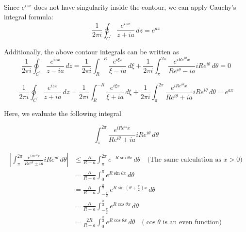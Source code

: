 \documentclass[letterpaper, 12pt]{article}
\theoremstyle{custom}
\begin{document}
Since $e^{izx}$ does not have singularity inside the contour, we can apply Cauchy's integral formula:
\begin{equation*}
  \frac{1}{2 \pi i} \oint_{C^\prime} \frac{e^{i z x}}{z+ia} \, dz = e^{a x}
\end{equation*}

Additionally, the above contour integrals can be written as
\begin{equation*}
  \frac{1}{2 \pi i} \oint_{C^\prime} \frac{e^{i z x}}{z-ia} \, dz 
  = \frac{1}{2 \pi i} \int_{R}^{-R} \frac{e^{i\xi x}}{\xi-ia} \, d\xi  + \frac{1}{2 \pi i} \int_{\pi}^{2 \pi} \frac{e^{i Re^{i \theta} x}}{Re^{i \theta}-ia} iRe^{i \theta} \, d \theta
  =0
\end{equation*}

\begin{equation*}
  \frac{1}{2 \pi i} \oint_{C^\prime} \frac{e^{i z x}}{z+ia} \, dz 
  = \frac{1}{2 \pi i} \int_{R}^{-R} \frac{e^{i\xi x}}{\xi+ia} \, d\xi  + \frac{1}{2 \pi i} \int_{\pi}^{2\pi} \frac{e^{i Re^{i \theta} x}}{Re^{i \theta}+ia} iRe^{i \theta} \, d \theta
  = e^{a x}
\end{equation*}

Here, we evaluate the following integral

\begin{equation*}
  \int_{\pi}^{2\pi} \frac{e^{i Re^{i \theta} x}}{Re^{i \theta} \pm ia} iRe^{i \theta} \, d \theta
\end{equation*}

\begin{align*}
  \left| \int_{\pi}^{2\pi} \frac{e^{i Re^{i \theta} x}}{Re^{i \theta} \pm ia} iRe^{i \theta} \, d \theta \right|
  & \leq \frac{R}{R-a}\int_{\pi}^{2\pi} e^{- R\sin \theta x} \, d \theta \quad \text{(The same calculation as $x>0$)}\\
  & =    \frac{R}{R-a}\int_{0}^{\pi} e^{R\sin \theta x} \, d \theta\\
  & =     \frac{R}{R-a}\int_{-\frac{\pi}{2}}^{\frac{\pi}{2}} e^{R\sin \left( \theta+\frac{\pi}{2}\right) x} \, d \theta\\
  & =     \frac{R}{R-a}\int_{-\frac{\pi}{2}}^{\frac{\pi}{2}} e^{R\cos \theta x} \, d \theta\\
  & =     \frac{2R}{R-a}\int_{0}^{\frac{\pi}{2}} e^{R\cos \theta x} \, d \theta \quad \text{($\cos \theta$ is an even function)}
\end{align*}
\end{document}
